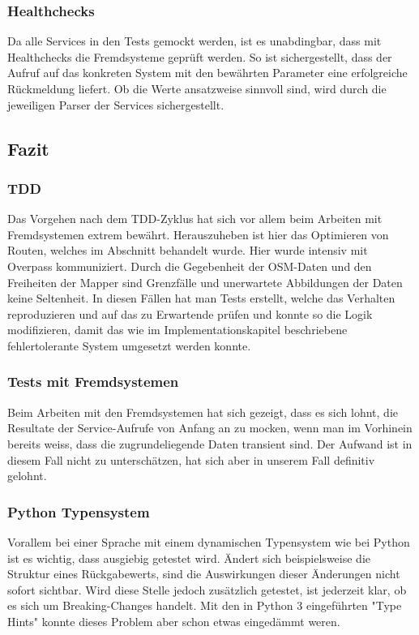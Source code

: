 \subsubsection{Healthchecks}
\label{test:Healthchecks}
Da alle Services in den Tests gemockt werden, ist es unabdingbar, dass mit Healthchecks die Fremdsysteme geprüft werden. So ist sichergestellt, dass der Aufruf auf das konkreten System mit den bewährten Parameter eine erfolgreiche Rückmeldung liefert. Ob die Werte ansatzweise sinnvoll sind, wird durch die jeweiligen Parser der Services sichergestellt.

\subsection{Fazit}
\label{test:Fazit}

\subsubsection{TDD}
\label{fazit:TDD}
Das Vorgehen nach dem \ac{TDD}-Zyklus hat sich vor allem beim Arbeiten mit Fremdsystemen extrem bewährt. Herauszuheben ist hier das Optimieren von Routen, welches im Abschnitt  behandelt wurde. Hier wurde intensiv mit Overpass \cite{wiki:overpass} kommuniziert. Durch die Gegebenheit der \ac{OSM}-Daten und den Freiheiten der Mapper sind Grenzfälle und unerwartete Abbildungen der Daten keine Seltenheit. In diesen Fällen hat man Tests erstellt, welche das Verhalten reproduzieren und auf das zu Erwartende prüfen und konnte so die Logik modifizieren, damit das wie im Implementationskapitel beschriebene fehlertolerante System umgesetzt werden konnte.

\subsubsection{Tests mit Fremdsystemen}
\label{fazit:Tests mit Fremdsystemen}
Beim Arbeiten mit den Fremdsystemen hat sich gezeigt, dass es sich lohnt, die Resultate der Service-Aufrufe von Anfang an zu mocken, wenn man im Vorhinein bereits weiss, dass die zugrundeliegende Daten transient sind. Der Aufwand ist in diesem Fall nicht zu unterschätzen, hat sich aber in unserem Fall definitiv gelohnt.

\subsubsection{Python Typensystem}
\label{fazit:Python Typesystem}
Vorallem bei einer Sprache mit einem dynamischen Typensystem wie bei Python ist es wichtig, dass ausgiebig getestet wird. Ändert sich beispielsweise die Struktur eines Rückgabewerts, sind die Auswirkungen dieser Änderungen nicht sofort sichtbar. Wird diese Stelle jedoch zusätzlich getestet, ist jederzeit klar, ob es sich um Breaking-Changes handelt. Mit den in Python 3 eingeführten "Type Hints" konnte dieses Problem aber schon etwas eingedämmt weren.
